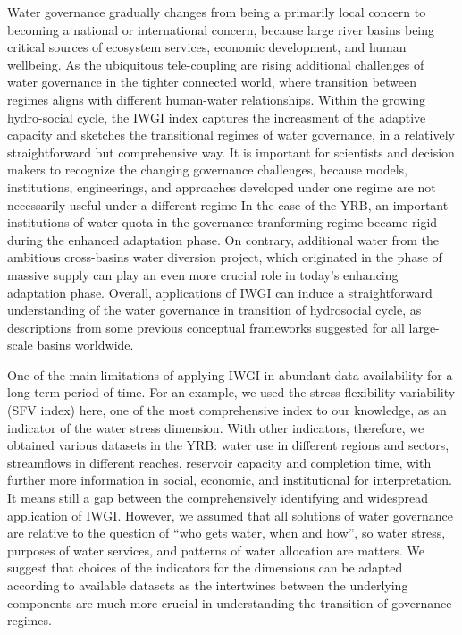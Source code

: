 Water governance gradually changes from being a primarily local concern to becoming a national or international concern, because large river basins being critical sources of ecosystem services, economic development, and human wellbeing.
As the ubiquitous tele-coupling are rising additional challenges of water governance in the tighter connected world, where transition between regimes aligns with different human-water relationships.
Within the growing hydro-social cycle, the IWGI index captures the increasment of the adaptive capacity and sketches the transitional regimes of water governance, in a relatively straightforward but comprehensive way.
It is important for scientists and decision makers to recognize the changing governance challenges, because models, institutions, engineerings, and approaches developed under one regime are not necessarily useful under a different regime
In the case of the YRB, an important institutions of water quota in the governance tranforming regime became rigid during the enhanced adaptation phase.
On contrary, additional water from the ambitious cross-basins water diversion project, which originated in the phase of massive supply can play an even more crucial role in today's enhancing adaptation phase.
Overall, applications of IWGI can induce a straightforward understanding of the water governance in transition of hydrosocial cycle, as descriptions from some previous conceptual frameworks suggested for all large-scale basins worldwide.

One of the main limitations of applying IWGI in abundant data availability for a long-term period of time.
For an example, we used the stress-flexibility-variability (SFV index) here, one of the most comprehensive index to our knowledge, as an indicator of the water stress dimension.
With other indicators, therefore, we obtained various datasets in the YRB: water use in different regions and sectors, streamflows in different reaches, reservoir capacity and completion time, with further more information in social, economic, and institutional for interpretation.
It means still a gap between the comprehensively identifying and widespread application of IWGI.
However, we assumed that all solutions of water governance are relative to the question of ``who gets water, when and how'', so water stress, purposes of water services, and patterns of water allocation are matters.
We suggest that choices of the indicators for the dimensions can be adapted according to available datasets as the intertwines between the underlying components are much more crucial in understanding the transition of governance regimes.

